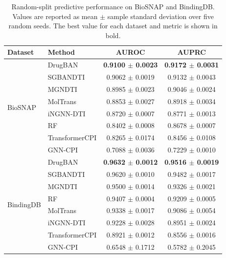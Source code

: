 \documentclass[computers,article,submit,moreauthors]{Definitions/mdpi}
\begin{document}
\begin{table}[H]
\caption{Random-split predictive performance on BioSNAP and BindingDB. Values are reported as mean $\pm$ sample standard deviation over five random seeds. The best value for each dataset and metric is shown in bold.}
\label{tab:model_performance}
\scriptsize
\setlength{\tabcolsep}{4pt}
\renewcommand{\arraystretch}{1.05}
\begin{tabular*}{\textwidth}{@{\extracolsep{\fill}}llcc@{}}
\toprule
\textbf{Dataset} & \textbf{Method} & \textbf{AUROC} & \textbf{AUPRC} \\
\midrule
\multirow{8}{*}{BioSNAP}
& DrugBAN        & \textbf{0.9100 $\pm$ 0.0023} & \textbf{0.9172 $\pm$ 0.0031} \\
& SGBANDTI       & 0.9062 $\pm$ 0.0019 & 0.9132 $\pm$ 0.0043 \\
& MGNDTI         & 0.8985 $\pm$ 0.0023 & 0.9046 $\pm$ 0.0024 \\
& MolTrans       & 0.8853 $\pm$ 0.0027 & 0.8918 $\pm$ 0.0034 \\
& iNGNN-DTI      & 0.8720 $\pm$ 0.0007 & 0.8771 $\pm$ 0.0013 \\
& RF             & 0.8402 $\pm$ 0.0008 & 0.8678 $\pm$ 0.0007 \\
& TransformerCPI & 0.8265 $\pm$ 0.0174 & 0.8456 $\pm$ 0.0108 \\
& GNN-CPI        & 0.7088 $\pm$ 0.0036 & 0.7229 $\pm$ 0.0010 \\
\midrule
\multirow{8}{*}{BindingDB}
& DrugBAN        & \textbf{0.9632 $\pm$ 0.0012} & \textbf{0.9516 $\pm$ 0.0019} \\
& SGBANDTI       & 0.9620 $\pm$ 0.0010 & 0.9482 $\pm$ 0.0017 \\
& MGNDTI         & 0.9500 $\pm$ 0.0014 & 0.9326 $\pm$ 0.0021 \\
& RF             & 0.9407 $\pm$ 0.0004 & 0.9209 $\pm$ 0.0005 \\
& MolTrans       & 0.9338 $\pm$ 0.0017 & 0.9086 $\pm$ 0.0054 \\
& iNGNN-DTI      & 0.9228 $\pm$ 0.0028 & 0.8951 $\pm$ 0.0024 \\
& TransformerCPI & 0.8921 $\pm$ 0.0012 & 0.8556 $\pm$ 0.0016 \\
& GNN-CPI        & 0.6548 $\pm$ 0.1712 & 0.5782 $\pm$ 0.2045 \\
\bottomrule
\end{tabular*}
\end{table}
\end{document}
